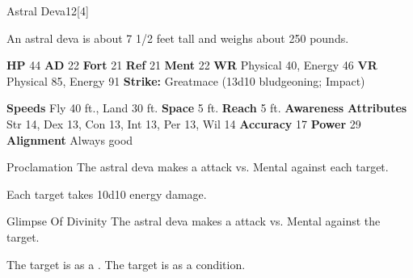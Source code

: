       
  \begin{monsubsection}{Astral Deva}{12}[4]
    \vspace{-1em}\vspace{-1em}
    \vspace{0em}

    
         An astral deva is about 7 1/2 feet tall and weighs about 250 pounds.
        
    

    \begin{spellcontent}
      \begin{spelltargetinginfo}
        \pari \textbf{HP} 44 \monsep
          \textbf{AD} 22 \monsep
          \textbf{Fort} 21 \monsep
          \textbf{Ref} 21 \monsep
          \textbf{Ment} 22
        \pari \textbf{WR} Physical 40, Energy 46 \monsep
        \textbf{VR} Physical 85, Energy 91
        \pari \textbf{Strike:}
            Greatmace  (13d10 bludgeoning; Impact)
      \end{spelltargetinginfo}
    \end{spellcontent}
    \begin{monsterfooter}
      \pari \textbf{Speeds} Fly 40 ft., Land 30 ft. \monsep
        \textbf{Space} 5 ft. \monsep
        \textbf{Reach} 5 ft.
      \pari \textbf{Awareness} 
      \pari \textbf{Attributes}
        Str 14, Dex 13,
        Con 13, Int 13,
        Per 13, Wil 14
      \pari \textbf{Accuracy} 17 \monsep
        \textbf{Power} 29
      \pari \textbf{Alignment} Always good
    \end{monsterfooter}
  \end{monsubsection}
  \begin{freeability}{Proclamation}
       The astral deva makes a  attack
        vs. Mental against each target.
    
    \hit Each target takes 10d10 energy damage.
    \end{freeability}
  

    \begin{freeability}{Glimpse Of Divinity}
       The astral deva makes a  attack
        vs. Mental against the target.
    
    \hit The target is  as a .
    \crit The target is  as a condition.
    \end{freeability}
  


